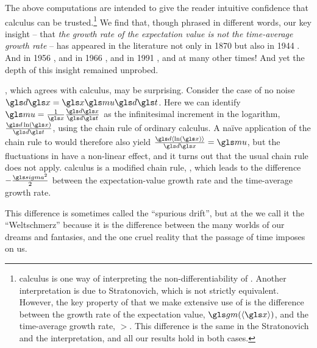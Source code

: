 The above computations are intended to give the reader intuitive confidence that \Ito calculus can be trusted.\footnote{\Ito calculus is one way of interpreting the non-differentiability of \gd\gW. Another interpretation is due to Stratonovich, which is not strictly equivalent. However, the key property of \GBM that we make extensive use of is the difference between the growth rate of the expectation value, $\gm(\ave{\x})$, and the time-average growth rate, $\gt$. This difference is the same in the Stratonovich and the \Ito interpretation, and all our results hold in both cases.} We find that, though phrased in different words, our key insight -- that {\it the growth rate of the expectation value is not the time-average growth rate} -- has appeared in the literature not only in 1870 \cite{Whitworth1867} but also in 1944 \cite{Ito1944}. And in 1956 \cite{Kelly1956}, and in 1966 \cite{Thorp1966}, and in 1991 \cite{CoverThomas1991}, and at many other times! And yet the depth of this insight remained unprobed.

, which agrees with \Ito calculus, may be surprising. Consider the case of no noise $\gd\x=\x \gmu \gd\t$. Here we can identify $\gmu=\frac{1}{\x}\frac{\gd\x}{\gd\t}$ as the infinitesimal increment in the logarithm, $\frac{\gd \ln(\x)}{\gd\t}$, using the chain rule of ordinary calculus. A na\"ive application of the chain rule to  would therefore also yield $\frac{\gd \ave{\ln(\x)}}{\gd\x}=\gmu$, but the fluctuations in \GBM have a non-linear effect, and it turns out that the usual chain rule does not apply. \Ito calculus is a modified chain rule, , which leads to the difference $-\frac{\gsigma^2}{2}$ between the expectation-value growth rate and the time-average growth rate. 

This difference is sometimes called the ``spurious drift'', but at the \LML we call it the ``Weltschmerz'' because it is the difference between the many worlds of our dreams and fantasies, and the one cruel reality that the passage of time imposes on us.

